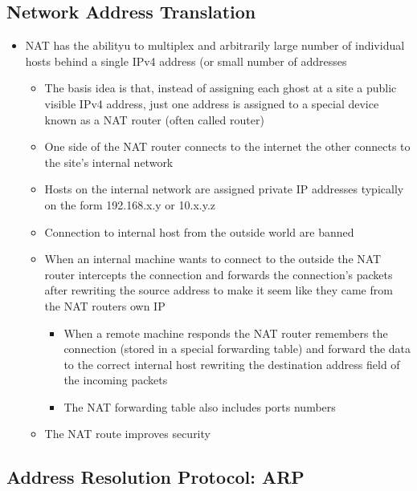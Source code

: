 \documentclass[11pt]{article}
\providecommand{\tightlist}{%
      \setlength{\itemsep}{0pt}\setlength{\parskip}{0pt}}
\begin{document}
    \subsection{Network Address
Translation}\label{network-address-translation}

\begin{itemize}
\tightlist
\item
  NAT has the abilityu to multiplex and arbitrarily large number of
  individual hosts behind a single IPv4 address (or small number of
  addresses

  \begin{itemize}
  \tightlist
  \item
    The basis idea is that, instead of assigning each ghost at a site a
    public visible IPv4 address, just one address is assigned to a
    special device known as a NAT router (often called router)
  \item
    One side of the NAT router connects to the internet the other
    connects to the site's internal network
  \item
    Hosts on the internal network are assigned private IP addresses
    typically on the form 192.168.x.y or 10.x.y.z
  \item
    Connection to internal host from the outside world are banned
  \item
    When an internal machine wants to connect to the outside the NAT
    router intercepts the connection and forwards the connection's
    packets after rewriting the source address to make it seem like they
    came from the NAT routers own IP

    \begin{itemize}
    \tightlist
    \item
      When a remote machine responds the NAT router remembers the
      connection (stored in a special forwarding table) and forward the
      data to the correct internal host rewriting the destination
      address field of the incoming packets
    \item
      The NAT forwarding table also includes ports numbers
    \end{itemize}
  \item
    The NAT route improves security
  \end{itemize}
\end{itemize}

    \subsection{Address Resolution Protocol:
ARP}\label{address-resolution-protocol-arp}
\end{document}
